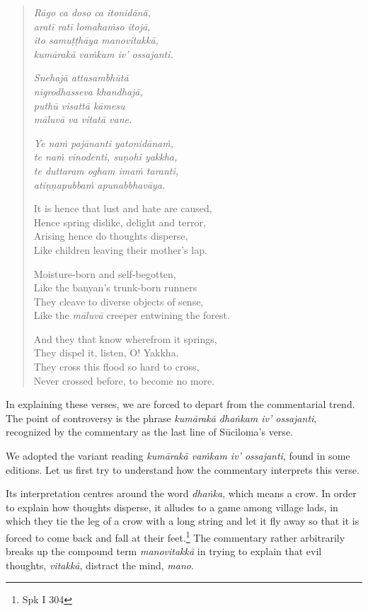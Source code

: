 \begin{quote}
\emph{Rāgo ca doso ca itonidānā,}\\
\emph{aratī ratī lomahaṁso itojā,}\\
\emph{ito samuṭṭhāya manovitakkā,}\\
\emph{kumārakā vaṁkam iv' ossajanti.}

\emph{Snehajā attasambhūtā}\\
\emph{nigrodhasseva khandhajā,}\\
\emph{puthū visattā kāmesu}\\
\emph{māluvā va vitatā vane.}

\emph{Ye naṁ pajānanti yatonidānaṁ,}\\
\emph{te naṁ vinodenti, suṇohi yakkha,}\\
\emph{te duttaram ogham imaṁ taranti,}\\
\emph{atiṇṇapubbaṁ apunabbhavāya.}

It is hence that lust and hate are caused,\\
Hence spring dislike, delight and terror,\\
Arising hence do thoughts disperse,\\
Like children leaving their mother's lap.

Moisture-born and self-begotten,\\
Like the banyan's trunk-born runners\\
They cleave to diverse objects of sense,\\
Like the \emph{māluvā} creeper entwining the forest.

And they that know wherefrom it springs,\\
They dispel it, listen, O! Yakkha.\\
They cross this flood so hard to cross,\\
Never crossed before, to become no more.
\end{quote}

\clearpage

In explaining these verses, we are forced to depart from the commentarial trend. The point of controversy is the phrase \emph{kumārakā dhaṅkam iv' ossajanti}, recognized by the commentary as the last line of Sūciloma's verse.

We adopted the variant reading \emph{kumārakā vaṁkam iv' ossajanti}, found in some editions. Let us first try to understand how the commentary interprets this verse.

Its interpretation centres around the word \emph{dhaṅka}, which means a crow. In order to explain how thoughts disperse, it alludes to a game among village lads, in which they tie the leg of a crow with a long string and let it fly away so that it is forced to come back and fall at their feet.\footnote{Spk I 304} The commentary rather arbitrarily breaks up the compound term \emph{manovitakkā} in trying to explain that evil thoughts, \emph{vitakkā}, distract the mind, \emph{mano}.

